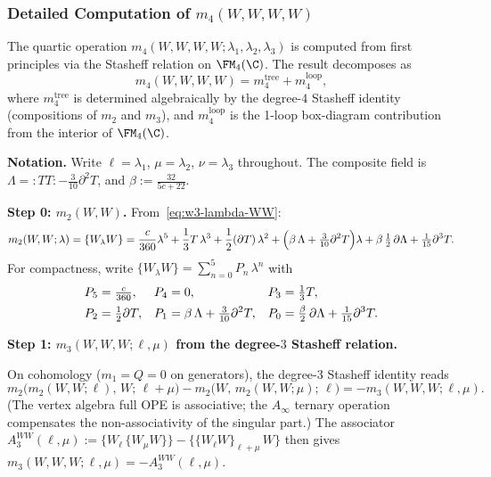 \subsubsection{Detailed Computation of $m_4(W,W,W,W)$}
\label{subsubsec:w3-m4-WWWW}

The quartic operation $m_4(W,W,W,W;\lambda_1,\lambda_2,\lambda_3)$ is computed from first
principles via the Stasheff relation on $\FM_4(\C)$.
The result decomposes as
\[
m_4(W,W,W,W) = m_4^{\mathrm{tree}} + m_4^{\mathrm{loop}},
\]
where $m_4^{\mathrm{tree}}$ is determined algebraically by the
degree-$4$ Stasheff identity (compositions of $m_2$ and $m_3$),
and $m_4^{\mathrm{loop}}$ is the 1-loop box-diagram contribution
from the interior of $\FM_4(\C)$.

\medskip
\noindent\textbf{Notation.} Write $\ell = \lambda_1$,
$\mu = \lambda_2$, $\nu = \lambda_3$ throughout. The
composite field is
$\Lambda = {:}TT{:} - \tfrac{3}{10}\partial^2 T$, and
$\beta := \tfrac{32}{5c+22}$.

\medskip
\noindent\textbf{Step 0: $m_2(W,W)$.}
From~\eqref{eq:w3-lambda-WW}:
\begin{equation}
\label{eq:m2WW-recap}
m_2(W,W;\lambda) = \{W_\lambda W\}
= \frac{c}{360}\lambda^5
 + \frac{1}{3}T\,\lambda^3
 + \frac{1}{2}(\partial T)\,\lambda^2
 + \Bigl(\beta\,\Lambda + \tfrac{3}{10}\partial^2 T\Bigr)\lambda
 + \beta\,\tfrac{1}{2}\,\partial\Lambda + \tfrac{1}{15}\partial^3 T.
\end{equation}
For compactness, write $\{W_\lambda W\} = \sum_{n=0}^{5} P_n\,\lambda^n$
with
\begin{align}
\label{eq:Pn-coefficients}
P_5 &= \tfrac{c}{360}, &
P_4 &= 0, &
P_3 &= \tfrac{1}{3}T, \notag\\
P_2 &= \tfrac{1}{2}\partial T, &
P_1 &= \beta\,\Lambda + \tfrac{3}{10}\partial^2 T, &
P_0 &= \tfrac{\beta}{2}\,\partial\Lambda + \tfrac{1}{15}\partial^3 T.
\end{align}

\medskip
\noindent\textbf{Step 1: $m_3(W,W,W;\ell,\mu)$ from the degree-$3$ Stasheff relation.}

\smallskip
On cohomology ($m_1 = Q = 0$ on generators), the degree-$3$ Stasheff
identity reads
\begin{equation}
\label{eq:w3-stasheff-3-WWW}
m_2\bigl(m_2(W,W;\ell),\, W;\, \ell+\mu\bigr)
- m_2\bigl(W,\, m_2(W,W;\mu);\, \ell\bigr)
= -m_3(W,W,W;\ell,\mu).
\end{equation}
(The vertex algebra full OPE is associative; the $A_\infty$ ternary
operation compensates the non-associativity of the singular part.)
The associator
$A_3^{WW}(\ell,\mu)
 := \{W_\ell\, \{W_\mu W\}\} - \{\{W_\ell W\}_{\ell+\mu}\, W\}$
then gives $m_3(W,W,W;\ell,\mu) = -A_3^{WW}(\ell,\mu)$.

